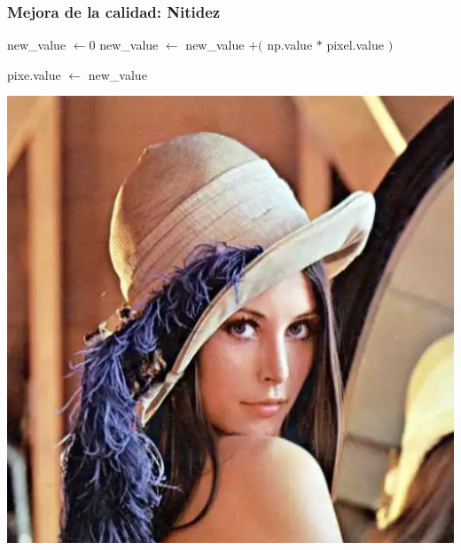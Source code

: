 \documentclass[
10pt, %
aspectratio=169, %
]{beamer}
\begin{document}
	\begin{frame}
		
		\frametitle{Mejora de la calidad: Nitidez}
		
		\begin{algorithmic}
					\State new\_value $\gets 0$ 
						\State new\_value $\gets$ new\_value $+($ np.value $*$ pixel.value $)$
					\EndFor
					
					pixe.value $\gets$ new\_value 
				\EndFor				
			\EndFunction
		\end{algorithmic}
		
		\centering
		\includegraphics[scale=0.44]{lena.png} 

\end{frame}
\end{document}
